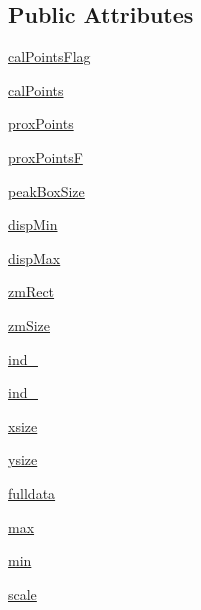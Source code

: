 \subsection*{Public Attributes}
\begin{DoxyCompactItemize}
\item 
\hyperlink{classmy_im_display_1_1my_im_display_a388bff72546f1d6fac13520142b77095}{cal\-Points\-Flag}
\item 
\hyperlink{classmy_im_display_1_1my_im_display_ae2050cee691f881f69d1bc9caa02b8f5}{cal\-Points}
\item 
\hyperlink{classmy_im_display_1_1my_im_display_acc86c3f609b093d1dab093d5d458db1c}{prox\-Points}
\item 
\hyperlink{classmy_im_display_1_1my_im_display_aa0bc29d37aa4ceea5a1b6e73bb1b5b2a}{prox\-Points\-F}
\item 
\hyperlink{classmy_im_display_1_1my_im_display_abe157e3a38400a86b33ed3ad78aee75d}{peak\-Box\-Size}
\item 
\hyperlink{classmy_im_display_1_1my_im_display_a73cfa3418c302cd63b7583b44b9c3b98}{disp\-Min}
\item 
\hyperlink{classmy_im_display_1_1my_im_display_a9472fc9988a7d5b4b3d26555eff36629}{disp\-Max}
\item 
\hyperlink{classmy_im_display_1_1my_im_display_a2fef2a841184ea3d06026f30fedb9c68}{zm\-Rect}
\item 
\hyperlink{classmy_im_display_1_1my_im_display_ad52cc4c765b66c9200b3d3fbf8415170}{zm\-Size}
\item 
\hyperlink{classmy_im_display_1_1my_im_display_a6ae8912d4d04b0a655e1a01fd8070ff6}{ind\-\_}
\item 
\hyperlink{classmy_im_display_1_1my_im_display_a4d83de595869c13b63e303709bc188a7}{ind\-\_}
\item 
\hyperlink{classmy_im_display_1_1my_im_display_a781283f5accbbaf7562ef6c4a85b662c}{xsize}
\item 
\hyperlink{classmy_im_display_1_1my_im_display_acd126c9a2504bff9bc339acc8f4160d4}{ysize}
\item 
\hyperlink{classmy_im_display_1_1my_im_display_ad82dd773b3509d7c4d283654bc2b22fe}{fulldata}
\item 
\hyperlink{classmy_im_display_1_1my_im_display_a3643bcc46e320625be4b0a16a366398b}{max}
\item 
\hyperlink{classmy_im_display_1_1my_im_display_a44e480bf21d1b2f540d95b03d0e41678}{min}
\item 
\hyperlink{classmy_im_display_1_1my_im_display_a60a3651bd482b77f17fd9758418576a6}{scale}

\end{DoxyCompactItemize}
